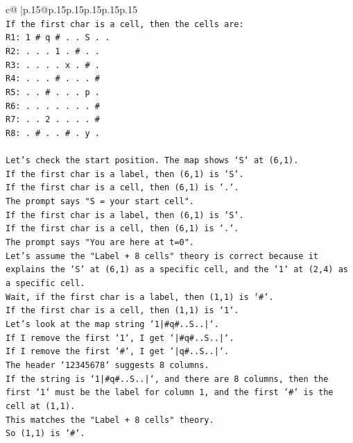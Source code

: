 \documentclass{article}
\begin{document}
{\begin{supertabular}{c@{$\;$}|p{.15\linewidth}@{}p{.15\linewidth}p{.15\linewidth}p{.15\linewidth}p{.15\linewidth}p{.15\linewidth}}
{{{\\ 
\texttt{If the first char is a cell, then the cells are:} \\
\texttt{R1: 1 \# q \# . . S . .} \\
\texttt{R2: . . . 1 . \# . .} \\
\texttt{R3: . . . . x . \# .} \\
\texttt{R4: . . . \# . . . \#} \\
\texttt{R5: . . \# . . . p .} \\
\texttt{R6: . . . . . . . \#} \\
\texttt{R7: . . 2 . . . . \#} \\
\texttt{R8: . \# . . \# . y .} \\
\\ 
\texttt{Let's check the start position. The map shows `S` at (6,1).} \\
\texttt{If the first char is a label, then (6,1) is `S`.} \\
\texttt{If the first char is a cell, then (6,1) is `.`.} \\
\texttt{The prompt says "S = your start cell".} \\
\texttt{If the first char is a label, then (6,1) is `S`.} \\
\texttt{If the first char is a cell, then (6,1) is `.`.} \\
\texttt{The prompt says "You are here at t=0".} \\
\texttt{Let's assume the "Label + 8 cells" theory is correct because it explains the `S` at (6,1) as a specific cell, and the `1` at (2,4) as a specific cell.} \\
\texttt{Wait, if the first char is a label, then (1,1) is `\#`.} \\
\texttt{If the first char is a cell, then (1,1) is `1`.} \\
\texttt{Let's look at the map string `1|\#q\#..S..|`.} \\
\texttt{If I remove the first `1`, I get `|\#q\#..S..|`.} \\
\texttt{If I remove the first `\#`, I get `|q\#..S..|`.} \\
\texttt{The header `12345678` suggests 8 columns.} \\
\texttt{If the string is `1|\#q\#..S..|`, and there are 8 columns, then the first `1` must be the label for column 1, and the first `\#` is the cell at (1,1).} \\
\texttt{This matches the "Label + 8 cells" theory.} \\
\texttt{So (1,1) is `\#`.} \\
}}}
\end{supertabular}}
\end{document}

